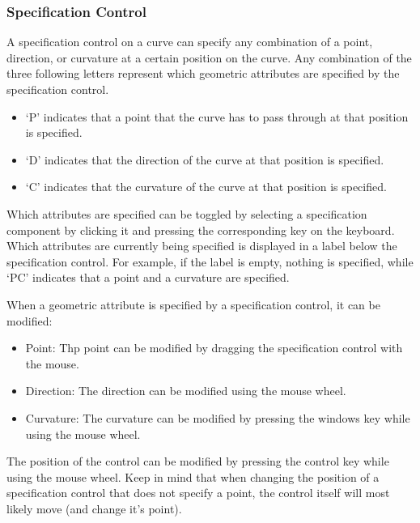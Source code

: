 \documentclass[a4paper]{article}
\begin{document}
				\subsubsection{Specification Control}
				\label{section:specification_control}
				
					A specification control on a curve can specify any combination of a point, direction, or curvature at a certain position on the curve. Any combination of the three following letters represent which geometric attributes are specified by the specification control. 
					
					\begin{itemize}
						\item `P' indicates that a point that the curve has to pass through at that position is specified.
						\item `D' indicates that the direction of the curve at that position is specified.
						\item `C' indicates that the curvature of the curve at that position is specified.
					\end{itemize}
					
					Which attributes are specified can be toggled by selecting a specification component by clicking it and pressing the corresponding key on the keyboard. Which attributes are currently being specified is displayed in a label below the specification control. For example, if the label is empty, nothing is specified, while `PC' indicates that a point and a curvature are specified.
					
					When a geometric attribute is specified by a specification control, it can be modified:
					
					\begin{itemize}
						\item Point: Thp point can be modified by dragging the specification control with the mouse.
						\item Direction: The direction can be modified using the mouse wheel.
						\item Curvature: The curvature can be modified by pressing the windows key while using the mouse wheel.
					\end{itemize}
					
					The position of the control can be modified by pressing the control key while using the mouse wheel. Keep in mind that when changing the position of a specification control that does not specify a point, the control itself will most likely move (and change it's point).
					
\end{document}

